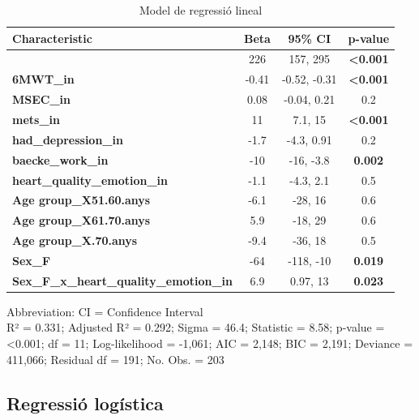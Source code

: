 \documentclass[CAT]{TFUOC}%
\begin{document}
\begin{table}[t]
\caption{\label{tab:lm-coefs}Model de regressió lineal} 
\fontsize{12.0pt}{14.0pt}\selectfont
\begin{tabular*}{\linewidth}{@{\extracolsep{\fill}}lccc}
\toprule
\textbf{Characteristic} & \textbf{Beta} & \textbf{95\% CI} & \textbf{p-value} \\ 
\midrule\addlinespace[2.5pt]
{\bfseries (Intercept)} & 226 & 157, 295 & {\bfseries <0.001} \\ 
{\bfseries 6MWT\_in} & -0.41 & -0.52, -0.31 & {\bfseries <0.001} \\ 
{\bfseries MSEC\_in} & 0.08 & -0.04, 0.21 & 0.2 \\ 
{\bfseries mets\_in} & 11 & 7.1, 15 & {\bfseries <0.001} \\ 
{\bfseries had\_depression\_in} & -1.7 & -4.3, 0.91 & 0.2 \\ 
{\bfseries baecke\_work\_in} & -10 & -16, -3.8 & {\bfseries 0.002} \\ 
{\bfseries heart\_quality\_emotion\_in} & -1.1 & -4.3, 2.1 & 0.5 \\ 
{\bfseries Age group\_X51.60.anys} & -6.1 & -28, 16 & 0.6 \\ 
{\bfseries Age group\_X61.70.anys} & 5.9 & -18, 29 & 0.6 \\ 
{\bfseries Age group\_X.70.anys} & -9.4 & -36, 18 & 0.5 \\ 
{\bfseries Sex\_F} & -64 & -118, -10 & {\bfseries 0.019} \\ 
{\bfseries Sex\_F\_x\_heart\_quality\_emotion\_in} & 6.9 & 0.97, 13 & {\bfseries 0.023} \\ 
\bottomrule
\end{tabular*}
\begin{minipage}{\linewidth}
\vspace{.05em}
Abbreviation: CI = Confidence Interval\\
R² = 0.331; Adjusted R² = 0.292; Sigma = 46.4; Statistic = 8.58; p-value = \textless{}0.001; df = 11; Log-likelihood = -1,061; AIC = 2,148; BIC = 2,191; Deviance = 411,066; Residual df = 191; No. Obs. = 203\\
\end{minipage}
\end{table}

\subsection{Regressió logística}\label{regressiuxf3-loguxedstica}
\end{document}
